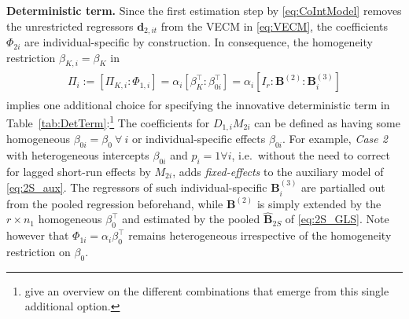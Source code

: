 \textbf{Deterministic term.} Since the first estimation step by \eqref{eq:CoIntModel} removes the unrestricted regressors $ \boldsymbol{d}_{2,it} $ from the VECM in \eqref{eq:VECM}, the coefficients $ \Phi_{2i} $ are individual-specific by construction. In consequence, the homogeneity restriction $ \beta_{K,i} = \beta_K $ in 
\begin{align} \label{eq:2S_det}
\begin{split}
	\Pi_i := \left[ \Pi_{K,i} : \Phi_{1,i} \right] = \alpha_i \left[ \beta_{K}^\top : \beta_{0i}^\top \right] = \alpha_i \left[I_r^{\ } : \mathbf{B}_{\ }^{(2)} : \mathbf{B}_i^{(3)} \right]
\end{split}
\end{align}
implies one additional choice for specifying the innovative deterministic term in Table~\ref{tab:DetTerm}:\footnote{\citet[Ch.~4.1]{GroenFrank2003} give an overview on the different combinations that emerge from this single additional option.} 
The coefficients for $ D_{1,i} M_{2i} $ can be defined as having some homogeneous $ \beta_{0i} = \beta_{0} \ \forall \ i $ or individual-specific effects $ \beta_{0i} $. For example, \textit{Case 2} with heterogeneous intercepts $ \beta_{0i} $ and $ p_i = 1 \forall i $, i.e.~without the need to correct for lagged short-run effects by $ M_{2i} $, adds \textit{fixed-effects} to the auxiliary model of \eqref{eq:2S_aux}. The regressors of such individual-specific $ \mathbf{B}_i^{(3)} $ are partialled out from the pooled regression beforehand, while $ \mathbf{B}^{(2)} $ is simply extended by the $ r \times n_1 $ homogeneous $ \beta_{0}^\top $ and estimated by the pooled $ \widehat{\mathbf{B}}_{2S} $ of \eqref{eq:2S_GLS}. Note however that $ \Phi_{1i} = \alpha_{i} \beta_{0}^\top $ remains heterogeneous irrespective of the homogeneity restriction on $ \beta_{0} $.


